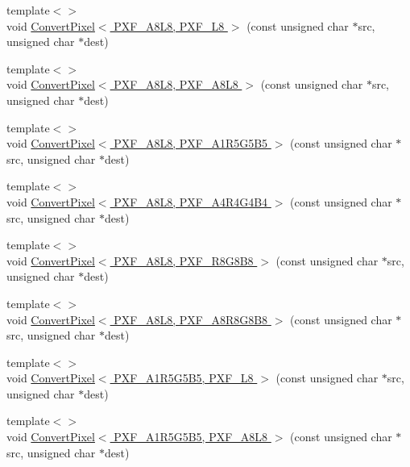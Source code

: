 \begin{DoxyCompactItemize}
\item 
{\footnotesize template$<$$>$ }\\void \hyperlink{_convert_pixel_8inl_ac48d1e6ac672e1e2e8d5746db9b30d9d}{Convert\-Pixel$<$ P\-X\-F\-\_\-\-A8\-L8, P\-X\-F\-\_\-\-L8 $>$} (const unsigned char $\ast$src, unsigned char $\ast$dest)
\item 
{\footnotesize template$<$$>$ }\\void \hyperlink{_convert_pixel_8inl_a2354d834255dcccf87944c2c39b05ba5}{Convert\-Pixel$<$ P\-X\-F\-\_\-\-A8\-L8, P\-X\-F\-\_\-\-A8\-L8 $>$} (const unsigned char $\ast$src, unsigned char $\ast$dest)
\item 
{\footnotesize template$<$$>$ }\\void \hyperlink{_convert_pixel_8inl_a286a89ffa2651826bc96df677e00d594}{Convert\-Pixel$<$ P\-X\-F\-\_\-\-A8\-L8, P\-X\-F\-\_\-\-A1\-R5\-G5\-B5 $>$} (const unsigned char $\ast$src, unsigned char $\ast$dest)
\item 
{\footnotesize template$<$$>$ }\\void \hyperlink{_convert_pixel_8inl_a797a1090a568689a0bfc8b93addd4791}{Convert\-Pixel$<$ P\-X\-F\-\_\-\-A8\-L8, P\-X\-F\-\_\-\-A4\-R4\-G4\-B4 $>$} (const unsigned char $\ast$src, unsigned char $\ast$dest)
\item 
{\footnotesize template$<$$>$ }\\void \hyperlink{_convert_pixel_8inl_ad9a9251a5d6eb1ab66d536f68e14fe69}{Convert\-Pixel$<$ P\-X\-F\-\_\-\-A8\-L8, P\-X\-F\-\_\-\-R8\-G8\-B8 $>$} (const unsigned char $\ast$src, unsigned char $\ast$dest)
\item 
{\footnotesize template$<$$>$ }\\void \hyperlink{_convert_pixel_8inl_aae02b1bc2ec34922e695eb2b0ec97459}{Convert\-Pixel$<$ P\-X\-F\-\_\-\-A8\-L8, P\-X\-F\-\_\-\-A8\-R8\-G8\-B8 $>$} (const unsigned char $\ast$src, unsigned char $\ast$dest)
\item 
{\footnotesize template$<$$>$ }\\void \hyperlink{_convert_pixel_8inl_a59aea03431463c8350071e16af1449fa}{Convert\-Pixel$<$ P\-X\-F\-\_\-\-A1\-R5\-G5\-B5, P\-X\-F\-\_\-\-L8 $>$} (const unsigned char $\ast$src, unsigned char $\ast$dest)
\item 
{\footnotesize template$<$$>$ }\\void \hyperlink{_convert_pixel_8inl_ad258926ce9d6e2689f2899b2b2dc66db}{Convert\-Pixel$<$ P\-X\-F\-\_\-\-A1\-R5\-G5\-B5, P\-X\-F\-\_\-\-A8\-L8 $>$} (const unsigned char $\ast$src, unsigned char $\ast$dest)
\item 

\end{DoxyCompactItemize}
